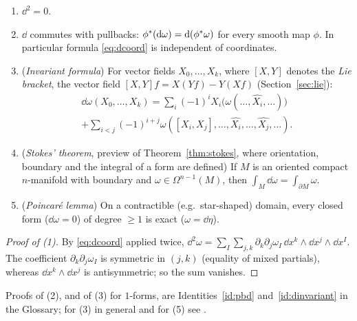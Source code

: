 \begin{theorem}\label{thm:dprops}
\begin{enumerate}
  \item $\dd^2=0$.
  \item $\dd$ commutes with pullbacks: $\phi{}^{*}(\mathrm{d}\omega)=\mathrm{d}(\phi{}^{*}\omega)$ for every smooth map $\phi$. In particular formula \eqref{eq:dcoord} is independent of coordinates.
  \item (\emph{Invariant formula}) For vector fields $X_0,\dots,X_k$, where $[X,Y]$ denotes the \emph{Lie bracket}, the vector field
  $[X,Y]f=X(Yf)-Y(Xf)$ (Section~\ref{sec:lie}):
  \begin{multline*}
  \dd\omega(X_0,\dots,X_k)=\sum_i(-1)^iX_i\bigl(\omega(\dots,\widehat{X_i},\dots)\bigr)\\
  +\sum_{i<j}(-1)^{i+j}\omega([X_i,X_j],\dots,\widehat{X_i},\dots,\widehat{X_j},\dots).
  \end{multline*}
  \item (\emph{Stokes' theorem}, preview of Theorem~\ref{thm:stokes}, where orientation, boundary and the integral of a form are defined) If $M$ is an oriented compact $n$-manifold with boundary and $\omega\in\Omega^{n-1}(M)$, then $\displaystyle\int_M\dd\omega=\int_{\partial M}\omega$.
  \item (\emph{Poincar\'e lemma}) On a contractible (e.g.\ star-shaped) domain, every closed form ($\dd\omega=0$) of degree $\ge1$ is exact ($\omega=\dd\eta$).
\end{enumerate}
\end{theorem}
\begin{proof}[Proof of (1)]
By \eqref{eq:dcoord} applied twice,
$\dd^2\omega=\sum_I\sum_{j,k}\partial_k\partial_j\omega_I\,\dd x^k\wedge\dd x^j\wedge\dd x^I.$
The coefficient $\partial_k\partial_j\omega_I$ is symmetric in $(j,k)$ (equality of mixed partials), whereas $\dd x^k\wedge\dd x^j$ is antisymmetric; so the sum vanishes.
\end{proof}
Proofs of (2), and of (3) for $1$-forms, are Identities~\ref{id:pbd} and~\ref{id:dinvariant} in the Glossary; for (3) in general and for (5) see \cite{Lee,BottTu}.

